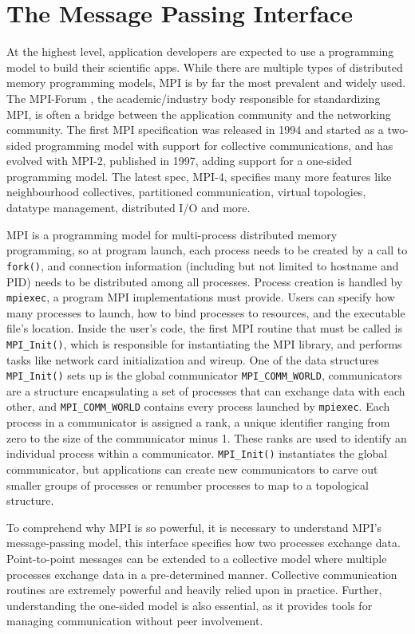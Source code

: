 \section{The Message Passing Interface}
At the highest level, application developers are expected to use a programming model to build their scientific apps. 
While there are multiple types of distributed memory programming models, \gls{MPI} is by far the most prevalent and widely used.
The MPI-Forum \cite{MPIForum}, the academic/industry body responsible for standardizing \gls{MPI}, is often a bridge between the application community and the networking community.
The first \gls{MPI} specification was released in 1994 and started as a two-sided programming model with support for collective communications, and has evolved with MPI-2, published in 1997, adding support for a one-sided programming model.
The latest spec, MPI-4, specifies many more features like neighbourhood collectives, partitioned communication, virtual topologies, datatype management, distributed I/O and more.

\gls{MPI} is a programming model for multi-process distributed memory programming, so at program launch, each process needs to be created by a call to \texttt{fork()}, and connection information (including but not limited to hostname and PID) needs to be distributed among all processes. 
Process creation is handled by \texttt{mpiexec}, a program \gls{MPI} implementations must provide. 
Users can specify how many processes to launch, how to bind processes to resources, and the executable file's location.
Inside the user's code, the first \gls{MPI} routine that must be called is \texttt{MPI\_Init()}, which is responsible for instantiating the \gls{MPI} library, and performs tasks like network card initialization and wireup.
One of the data structures \texttt{MPI\_Init()} sets up is the global communicator \texttt{MPI\_COMM\_WORLD}, communicators are a structure encapsulating a set of processes that can exchange data with each other, and \texttt{MPI\_COMM\_WORLD} contains every process launched by \texttt{mpiexec}.
Each process in a communicator is assigned a rank, a unique identifier ranging from zero to the size of the communicator minus 1. 
These ranks are used to identify an individual process within a communicator.
\texttt{MPI\_Init()} instantiates the global communicator, but applications can create new communicators to carve out smaller groups of processes or renumber processes to map to a topological structure.

To comprehend why \gls{MPI} is so powerful, it is necessary to understand \gls{MPI}'s message-passing model, this interface specifies how two processes exchange data.
Point-to-point messages can be extended to a collective model where multiple processes exchange data in a pre-determined manner.
Collective communication routines are extremely powerful and heavily relied upon in practice.
Further, understanding the one-sided model is also essential, as it provides tools for managing communication without peer involvement.

